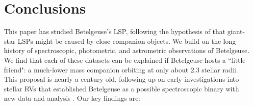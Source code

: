 \documentclass[twocolumn]{aastex631}
\begin{document}
\section{Conclusions}\label{sec:conclusions}

This paper has studied Betelgeuse's LSP, following the hypothesis of \citet{2021ApJ...911L..22S} that giant-star LSPs might be caused by close companion objects. We build on the long history of spectroscopic, photometric, and astrometric observations of Betelgeuse.  We find that each of these datasets can be explained if Betelgeuse hosts a ``little friend": a much-lower mass companion orbiting at only about 2.3 stellar radii. This proposal is nearly a century old, following up on early investigations into stellar RVs that established Betelgeuse as a possible spectroscopic binary \citep[e.g.][]{1908PASP...20..227P,1910LicOB...6...17C,1911LicOB...6..154C,1916ApJ....44..250L,1928MNRAS..88..660S} with new data and analysis \citep[also see][ for a parallel analysis]{2024arXiv240809089G}. Our key findings are:
\end{document}

